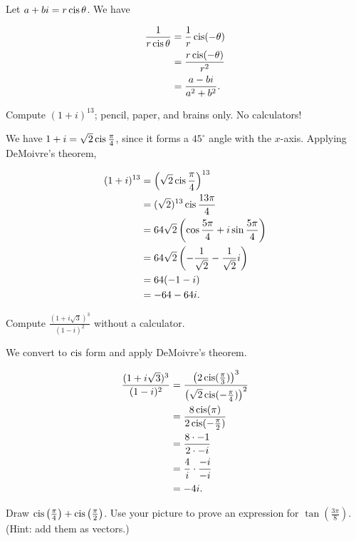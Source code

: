 \documentclass[../key.tex]{subfiles}
\begin{document}
Let $a+bi=r\operatorname{cis}\theta$. We have

\begin{align*}
\frac{1}{r\operatorname{cis}\theta} &= \frac{1}{r}\operatorname{cis} (-\theta) \\
&= \frac{r\operatorname{cis} (-\theta)}{r^2} \\
&= \frac{a-bi}{a^2+b^2}.
\end{align*}

\begin{outer_problem}
\item Compute $(1+i)^{13}$; pencil, paper, and brains only. No calculators!
\end{outer_problem}

We have $1+i=\sqrt{2} \operatorname{cis} \frac{\pi}{4}$, since it forms a $45^\circ$ angle with the $x$-axis. Applying DeMoivre's theorem,

\begin{align*}
(1+i)^{13} &= \left(\sqrt{2} \operatorname{cis} \frac{\pi}{4}\right)^{13} \\
&= (\sqrt{2})^{13} \operatorname{cis} \frac{13\pi}{4} \\
&= 64\sqrt{2} \left(\cos \frac{5\pi}{4} + i\sin \frac{5\pi}{4}\right) \\
&= 64\sqrt{2} \left(-\frac{1}{\sqrt{2}} - \frac{1}{\sqrt{2}}i\right) \\
&= 64 (-1-i) \\
&= -64-64i.
\end{align*}

\begin{outer_problem}
\item Compute $\frac{(1+i\sqrt{3})^3}{(1-i)^2}$ without a calculator.
\end{outer_problem}

We convert to $\operatorname{cis}$ form and apply DeMoivre's theorem.

\begin{align*}
\frac{(1+i\sqrt{3})^3}{(1-i)^2} &= \frac{\left(2\operatorname{cis} (\frac{\pi}{3})\right)^3}{\left(\sqrt{2}\operatorname{cis} (-\frac{\pi}{4})\right)^2} \\
&= \frac{8\operatorname{cis}(\pi)}{2\operatorname{cis} (-\frac{\pi}{2})} \\
&= \frac{8 \cdot -1}{2 \cdot -i} \\
&= \frac{4}{i}\cdot \frac{-i}{-i} \\
&= -4i.
\end{align*}

\begin{outer_problem}
\item Draw $\operatorname{cis}\left(\frac{\pi}{4}\right) + \operatorname{cis}\left(\frac{\pi}{2}\right)$. Use your picture to prove an expression for $\tan\left(\frac{3\pi}{8}\right)$. (Hint: add them as vectors.)
\end{outer_problem}
\end{document}
